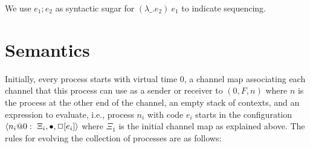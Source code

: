 \documentclass{article}
\begin{document}
We use $e_1;e_2$ as syntactic sugar for $(\lambda \_.e_2)~e_1$ to indicate
sequencing.

\section{Semantics} 

Initially, every process starts with virtual time 0, a channel map
associating each channel that this process can use as a sender or receiver to
$(0,F,n)$ where $n$ is the process at the other end of the channel, an empty
stack of contexts, and an expression to evaluate, i.e., process $n_i$ with
code $e_i$ starts in the configuration
$\proc{n_i}{\bullet}{\Xi_i}{\Box[e_i]}{0}$ where $\Xi_1$ is the initial
channel map as explained above. The rules for evolving the collection of
processes are as follows:
\end{document}
